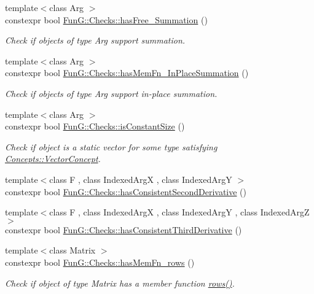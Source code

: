 \begin{DoxyCompactItemize}
{\footnotesize template$<$class Arg $>$ }\\constexpr bool \hyperlink{group__Checks_ga8545906a81acf9f533c3342b0d02a6e9}{Fun\+G\+::\+Checks\+::has\+Free\+\_\+\+Summation} ()
\begin{DoxyCompactList}\small\item\em Check if objects of type Arg support summation. \end{DoxyCompactList}\item 
{\footnotesize template$<$class Arg $>$ }\\constexpr bool \hyperlink{group__Checks_ga5357edca3d0fdcfbc1fba5fd43713b40}{Fun\+G\+::\+Checks\+::has\+Mem\+Fn\+\_\+\+In\+Place\+Summation} ()
\begin{DoxyCompactList}\small\item\em Check if objects of type Arg support in-\/place summation. \end{DoxyCompactList}\item 
{\footnotesize template$<$class Arg $>$ }\\constexpr bool \hyperlink{group__Checks_gadcc3e179af2ed0384a3773ea086045b9}{Fun\+G\+::\+Checks\+::is\+Constant\+Size} ()
\begin{DoxyCompactList}\small\item\em Check if object is a static vector for some type satisfying \hyperlink{structFunG_1_1Concepts_1_1VectorConcept}{Concepts\+::\+Vector\+Concept}. \end{DoxyCompactList}\item 
{\footnotesize template$<$class F , class Indexed\+Arg\+X , class Indexed\+Arg\+Y $>$ }\\constexpr bool \hyperlink{group__Checks_ga072e2c21fa90be998a34975fb2975772}{Fun\+G\+::\+Checks\+::has\+Consistent\+Second\+Derivative} ()
\item 
{\footnotesize template$<$class F , class Indexed\+Arg\+X , class Indexed\+Arg\+Y , class Indexed\+Arg\+Z $>$ }\\constexpr bool \hyperlink{group__Checks_gaad092e45db1d0c1d7b6f69a5562679fa}{Fun\+G\+::\+Checks\+::has\+Consistent\+Third\+Derivative} ()
\item 
{\footnotesize template$<$class Matrix $>$ }\\constexpr bool \hyperlink{group__Checks_ga68fd30eff9d106c399b2b0e9a1f1b822}{Fun\+G\+::\+Checks\+::has\+Mem\+Fn\+\_\+rows} ()
\begin{DoxyCompactList}\small\item\em Check if object of type Matrix has a member function \hyperlink{namespaceFunG_1_1LinearAlgebra_abd3afa2fcd2194787342b2662cfa9f5a}{rows()}. \end{DoxyCompactList}\item 

\end{DoxyCompactItemize}
